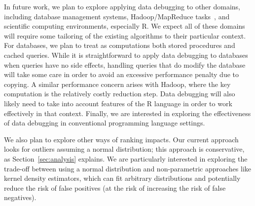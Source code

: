 In future work, we plan to explore applying data debugging to other
domains, including database management systems, Hadoop/MapReduce
tasks~\cite{dean2008mapreduce,hadoop}, and scientific computing environments, especially R. We expect
all of these domains will require some tailoring of the existing
algorithms to their particular context. For databases, we plan to
treat as computations both stored procedures and cached queries. While
it is straightforward to apply data debugging to databases when
queries have no side effects, handling queries that do modify the
database will take some care in order to avoid an excessive
performance penalty due to copying. A similar performance concern
arises with Hadoop, where the key computation is the relatively costly
reduction step. Data debugging will also likely need to take into
account features of the R language in order to work effectively in
that context. Finally, we are interested in exploring the
effectiveness of data debugging in conventional programming language
settings.

We also plan to explore other ways of ranking impacts. Our current
approach looks for outliers assuming a normal distribution; this
approach is conservative, as Section~\ref{sec:analysis} explains. We
are particularly interested in exploring the trade-off between using a
normal distribution and non-parametric approaches like kernel
density estimators, which can fit arbitrary distributions and
potentially reduce the risk of false positives (at the risk of
increasing the risk of false negatives).
